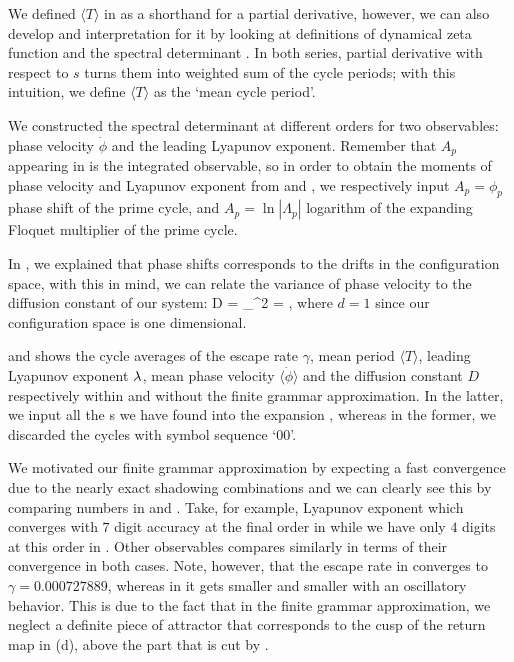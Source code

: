 {{{We defined $\langle T \rangle$ in  as a shorthand for a partial
derivative, however, we can also develop and interpretation for it by looking at
definitions of dynamical zeta function  and the spectral 
determinant . In both series, partial derivative with
respect to $s$ turns them into weighted sum of the cycle periods; with this intuition, 
we define $\langle T \rangle$ as the `mean cycle period'.

We constructed the spectral determinant  at different 
orders for two observables: phase velocity $\dot{\phi}$ and the leading Lyapunov 
exponent. Remember that $A_p$ appearing in  is the
integrated observable, so in order to obtain the moments of phase velocity and
Lyapunov exponent from  and , we respectively input 
$A_p = \phi_p$ phase shift of the prime cycle, and $A_p = \ln |\Lambda_p|$ logarithm
of the expanding Floquet multiplier of the prime cycle. 

In , we explained that  phase shifts corresponds to 
the drifts in the configuration space, with this in mind, we can relate the 
variance of phase velocity to the diffusion constant of our system:
\beq
    D =  \sigma_{\dot{\phi}}^2 
      =  ,
\eeq
where $d=1$ since our configuration space is one dimensional. 

 and  shows
the cycle averages of the escape rate $\gamma$, mean period $\langle T \rangle$,
leading Lyapunov exponent $\lambda$, mean phase velocity $\langle \dot{\phi} \rangle$
and the diffusion constant $D$ respectively within and without the finite grammar 
approximation. In the latter, we input all the \rpo s we have found into the expansion
, whereas in the former, we discarded the cycles
with symbol sequence `00'.




We motivated our finite grammar approximation by expecting a fast convergence 
due to the nearly exact shadowing combinations and we can clearly see this 
by comparing numbers in 
 and .
Take, for example, Lyapunov exponent which converges with $7$ digit accuracy
at the final order in  while we have only $4$ digits 
at this order in . Other observables compares
similarly in terms of their convergence in both cases. Note, however, that the 
escape rate in  converges to $\gamma = 0.000727889$,
whereas in  it gets smaller and smaller
with an oscillatory behavior. This is due to the fact that in the finite grammar
approximation, we neglect a definite piece of attractor that corresponds to the 
cusp of the return map in  (d), above the part that 
is cut by .

}}}
